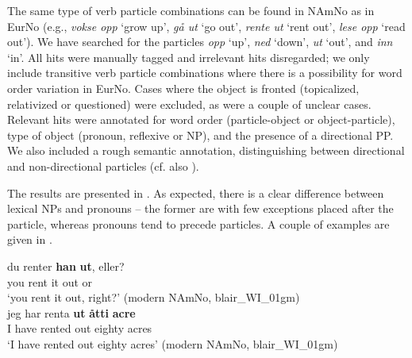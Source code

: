 \documentclass[output=paper]{langscibook}
\begin{document}
The same type of verb particle combinations can be found in NAmNo as in EurNo (e.g., \textit{vokse opp} ‘grow up’, \textit{gå ut} ‘go out’, \textit{rente ut} ‘rent out’, \textit{lese opp} ‘read out’). We have searched for the particles \textit{opp} ‘up’, \textit{ned} ‘down’, \textit{ut} ‘out’, and \textit{inn} ‘in’. All hits were manually tagged and irrelevant hits disregarded; we only include transitive verb particle combinations where there is a possibility for word order variation in EurNo. Cases where the object is fronted (topicalized, relativized or questioned) were excluded, as were a couple of unclear cases. Relevant hits were annotated for word order (particle-object or object-particle), type of object (pronoun, reflexive or NP), and the presence of a directional PP. We also included a rough semantic annotation, distinguishing between directional and non-directional particles (cf. also \citealt{LarssonKinn2021}). 

The results are presented in . As expected, there is a clear difference between lexical NPs and pronouns – the former are with few exceptions placed after the particle, whereas pronouns tend to precede particles. A couple of examples are given in .

\ea%
    \label{ex:larsson:28}
    \ea 
    \gll du renter \textbf{han} \textbf{ut}, eller?\\
         you rent it out or\\
    \glt ‘you rent it out, right?’ (modern NAmNo, blair\_WI\_01gm)\label{ex:larsson:28a}\\ 
    \ex 
    \gll jeg har renta \textbf{ut} \textbf{åtti} \textbf{acre}\\
         I have rented out eighty acres\\
    \glt ‘I have rented out eighty acres’ (modern NAmNo, blair\_WI\_01gm)\label{ex:larsson:28b}\\
    \z %
\z
\end{document}
